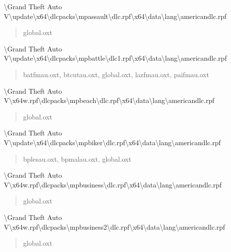 \documentclass[]{scrartcl}
\begin{document}
\textbackslash{}Grand Theft Auto V\textbackslash{}update\textbackslash{}x64\textbackslash{}dlcpacks\textbackslash{}mpassault\textbackslash{}dlc.rpf\textbackslash{}x64\textbackslash{}data\textbackslash{}lang\textbackslash{}americandlc.rpf

\begin{quote}
   \ttfamily
   global.oxt
\end{quote}

\textbackslash{}Grand Theft Auto V\textbackslash{}update\textbackslash{}x64\textbackslash{}dlcpacks\textbackslash{}mpbattle\textbackslash{}dlc1.rpf\textbackslash{}x64\textbackslash{}data\textbackslash{}lang\textbackslash{}americandlc.rpf

\begin{quote}
   \ttfamily
   batfmau.oxt, btcutau.oxt, global.oxt, lazfmau.oxt, paifmau.oxt
\end{quote}

\textbackslash{}Grand Theft Auto V\textbackslash{}x64w.rpf\textbackslash{}dlcpacks\textbackslash{}mpbeach\textbackslash{}dlc.rpf\textbackslash{}x64\textbackslash{}data\textbackslash{}lang\textbackslash{}americandlc.rpf

\begin{quote}
   \ttfamily
   global.oxt
\end{quote}

\textbackslash{}Grand Theft Auto V\textbackslash{}update\textbackslash{}x64\textbackslash{}dlcpacks\textbackslash{}mpbiker\textbackslash{}dlc.rpf\textbackslash{}x64\textbackslash{}data\textbackslash{}lang\textbackslash{}americandlc.rpf

\begin{quote}
   \ttfamily
   bplesau.oxt, bpmalau.oxt, global.oxt
\end{quote}

\textbackslash{}Grand Theft Auto V\textbackslash{}x64w.rpf\textbackslash{}dlcpacks\textbackslash{}mpbusiness\textbackslash{}dlc.rpf\textbackslash{}x64\textbackslash{}data\textbackslash{}lang\textbackslash{}americandlc.rpf

\begin{quote}
   \ttfamily
   global.oxt
\end{quote}

\textbackslash{}Grand Theft Auto V\textbackslash{}x64w.rpf\textbackslash{}dlcpacks\textbackslash{}mpbusiness2\textbackslash{}dlc.rpf\textbackslash{}x64\textbackslash{}data\textbackslash{}lang\textbackslash{}americandlc.rpf

\begin{quote}
   \ttfamily
   global.oxt
\end{quote}
\end{document}
